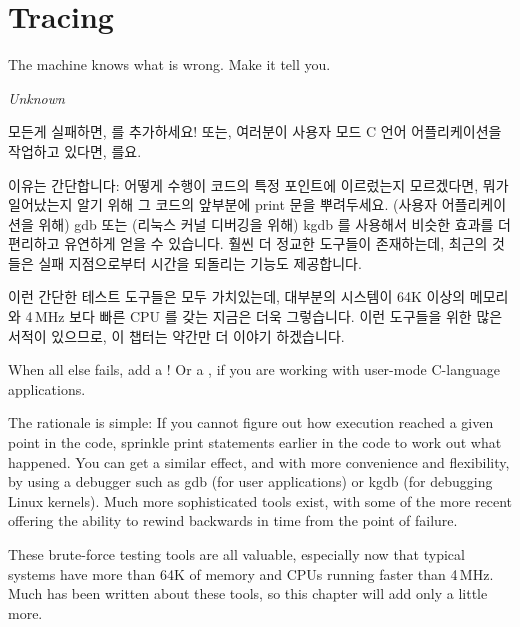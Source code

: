 \section{Tracing}
\label{sec:debugging:Tracing}
%
\epigraph{The machine knows what is wrong.  Make it tell you.}{\emph{Unknown}}

모든게 실패하면,  를 추가하세요!
또는, 여러분이 사용자 모드 C 언어 어플리케이션을 작업하고 있다면, 
를요.

이유는 간단합니다: 어떻게 수행이 코드의 특정 포인트에 이르렀는지 모르겠다면,
뭐가 일어났는지 알기 위해 그 코드의 앞부분에 print 문을 뿌려두세요.
(사용자 어플리케이션을 위해) gdb 또는 (리눅스 커널 디버깅을 위해) kgdb 를
사용해서 비슷한 효과를 더 편리하고 유연하게 얻을 수 있습니다.
훨씬 더 정교한 도구들이 존재하는데, 최근의 것들은 실패 지점으로부터 시간을
되돌리는 기능도 제공합니다.

이런 간단한 테스트 도구들은 모두 가치있는데, 대부분의 시스템이 64K 이상의
메모리와 4\,MHz 보다 빠른 CPU 를 갖는 지금은 더욱 그렇습니다.
이런 도구들을 위한 많은 서적이 있으므로, 이 챕터는 약간만 더 이야기 하겠습니다.

\iffalse

When all else fails, add a !
Or a , if you are working with user-mode C-language applications.

The rationale is simple: If you cannot figure out how execution reached
a given point in the code, sprinkle print statements earlier in the
code to work out what happened.
You can get a similar effect, and with more convenience and flexibility,
by using a debugger such as gdb (for user applications) or kgdb
(for debugging Linux kernels).
Much more sophisticated tools exist, with some of the more recent
offering the ability to rewind backwards in time from the point
of failure.

These brute-force testing tools are all valuable, especially now
that typical systems have more than 64K of memory and CPUs running
faster than 4\,MHz.
Much has been
written about these tools, so this chapter will add only a little more.

